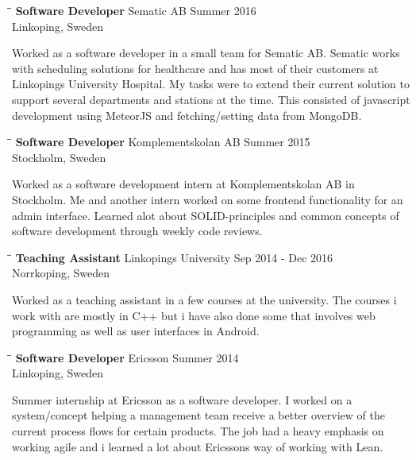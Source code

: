 \documentclass{res}
\begin{document}
\begin{resume}
   \begin{tabbing}
   \hspace{2.3in}\= \hspace{2.6in}\= \kill %
    {\bf Software Developer} \>Sematic AB     \>Summer 2016\\
                             \>Linkoping, Sweden
   \end{tabbing}\vspace{-20pt}      %
   Worked as a software developer in a small team for Sematic AB. Sematic works with scheduling solutions for healthcare and has most of their customers at Linkopings University Hospital. My tasks were to extend their current solution to support several departments and stations at the time. This consisted of javascript development using MeteorJS and fetching/setting data from MongoDB.
   \begin{tabbing}
   \hspace{2.3in}\= \hspace{2.6in}\= \kill %
    {\bf Software Developer} \>Komplementskolan AB     \>Summer 2015\\
                             \>Stockholm, Sweden
   \end{tabbing}\vspace{-20pt}      %
    Worked as a software development intern at Komplementskolan AB in Stockholm. Me and another intern worked on some frontend functionality for an admin interface. Learned alot about SOLID-principles and common concepts of software development through weekly code reviews.

     \begin{tabbing}
   \hspace{2.3in}\= \hspace{2.6in}\= \kill %
    {\bf Teaching Assistant} \>Linkopings University     \>Sep 2014 - Dec 2016\\
                             \>Norrkoping, Sweden
   \end{tabbing}\vspace{-20pt}      %
    Worked as a teaching assistant in a few courses at the university. The courses i work with are mostly in C++ but i have also done some that involves web programming as well as user interfaces in Android.


   \begin{tabbing}
   \hspace{2.3in}\= \hspace{2.6in}\= \kill %
    {\bf Software Developer} \>Ericsson     \>Summer 2014\\
                             \>Linkoping, Sweden
   \end{tabbing}\vspace{-20pt}      %
    Summer internship at Ericsson as a software developer. I worked on a system/concept helping a management team receive a better overview of the current process flows for certain products. The job had a heavy emphasis on working agile and i learned a lot about Ericssons way of working with Lean.


\end{resume}
\end{document}

